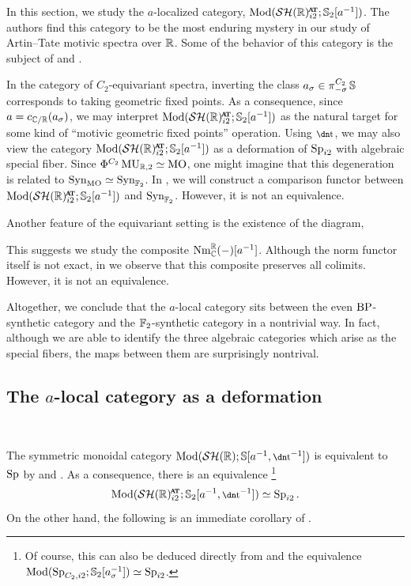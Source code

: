 In this section, we study the $a$-localized category, $\Mod(\SHR^{\at}_{i2} ; \Ss_2 [a^{-1}])$.
The authors find this category to be the most enduring mystery in our study of Artin--Tate motivic spectra over $\mathbb{R}$.
Some of the behavior of this category is the subject of  and .

In the category of $C_2$-equivariant spectra,
inverting the class $a_{\sigma} \in \pi_{-\sigma}^{C_2} \operatorname{\mathbb{S}}$ corresponds to taking geometric fixed points.
As a consequence, since $a = c_{\mathbb{C}/\mathbb{R}}(a_\sigma)$, we may interpret $\Mod(\SHR^{\at}_{i2} ; \Ss_2 [a^{-1}])$ as the natural target for some kind of ``motivic geometric fixed points'' operation.
Using $\ta$, we may also view the category $\Mod(\SHRat ; \Ss_2 [a^{-1}])$ as a deformation of $\operatorname{\mathrm{Sp}}_{i2}$ with algebraic special fiber.
Since $\Phi^{C_2} \operatorname{\mathrm{MU}}_{\mathbb{R},2} \simeq \operatorname{\mathrm{MO}}$, one might imagine that this degeneration is related to $\mathrm{Syn}_{\operatorname{\mathrm{MO}}} \simeq \mathrm{Syn}_{\operatorname{\mathbb{F}}_2}$. In , we will construct a comparison functor between $\Mod(\SHRat ; \Ss_2 [a^{-1}])$ and $\mathrm{Syn}_{\operatorname{\mathbb{F}}_2}$. However, it is not an equivalence.

Another feature of the equivariant setting is the existence of the diagram,
\begin{center}  \end{center}
This suggests we study the composite $\mathrm{Nm}_{\mathbb{C}}^{\mathbb{R}}(-)[a^{-1}]$.
Although the norm functor itself is not exact, in  we observe that this composite preserves all colimits. However, it is not an equivalence.

Altogether, we conclude that the $a$-local category sits between the even $\mathrm{BP}$-synthetic category and the $\operatorname{\mathbb{F}}_2$-synthetic category in a nontrivial way. In fact, although we are able to identify the three algebraic categories which arise as the special fibers, the maps between them are surprisingly nontrival. 

\subsection{The $a$-local category as a deformation}\

The symmetric monoidal category $\Mod(\SHR; \Ss[a^{-1}, \ta^{-1}])$ is equivalent to $\operatorname{\mathrm{Sp}}$ by \cite{RealEtale} and . As a consequence, there is an equivalence \footnote{Of course, this can also be deduced directly from  and the equivalence $\mathrm{Mod}(\operatorname{\mathrm{Sp}}_{C_2, i2} ; \operatorname{\mathbb{S}}_2 [a_\sigma ^{-1}]) \simeq \operatorname{\mathrm{Sp}}_{i2}$.}
\[ \Mod(\SHRat; \Ss_2[a^{-1}, \ta^{-1}]) \simeq \Sp_{i2}. \]
On the other hand, the following is an immediate corollary of .

